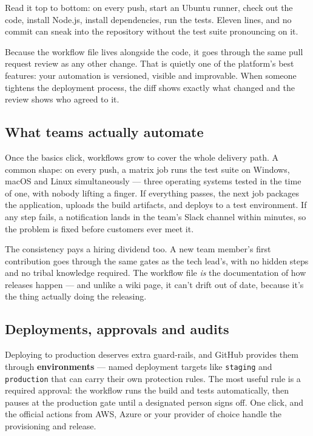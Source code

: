 Read it top to bottom: on every push, start an Ubuntu runner, check out the code, install Node.js, install dependencies, run the tests. Eleven lines, and no commit can sneak into the repository without the test suite pronouncing on it.


Because the workflow file lives alongside the code, it goes through the same pull request review as any other change. That is quietly one of the platform's best features: your automation is versioned, visible and improvable. When someone tightens the deployment process, the diff shows exactly what changed and the review shows who agreed to it.



\subsection{What teams actually automate}


Once the basics click, workflows grow to cover the whole delivery path. A common shape: on every push, a matrix job runs the test suite on Windows, macOS and Linux simultaneously — three operating systems tested in the time of one, with nobody lifting a finger. If everything passes, the next job packages the application, uploads the build artifacts, and deploys to a test environment. If any step fails, a notification lands in the team's Slack channel within minutes, so the problem is fixed before customers ever meet it.


The consistency pays a hiring dividend too. A new team member's first contribution goes through the same gates as the tech lead's, with no hidden steps and no tribal knowledge required. The workflow file \emph{is} the documentation of how releases happen — and unlike a wiki page, it can't drift out of date, because it's the thing actually doing the releasing.



\subsection{Deployments, approvals and audits}


Deploying to production deserves extra guard-rails, and GitHub provides them through \textbf{environments} — named deployment targets like \texttt{staging} and \texttt{production} that can carry their own protection rules. The most useful rule is a required approval: the workflow runs the build and tests automatically, then pauses at the production gate until a designated person signs off. One click, and the official actions from AWS, Azure or your provider of choice handle the provisioning and release.


